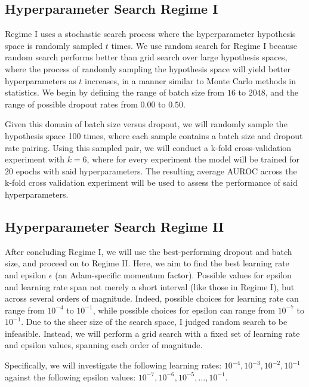 \subsection{Hyperparameter Search Regime I}\label{sec:regime-i}

Regime I uses a stochastic search process where the hyperparameter hypothesis space is randomly sampled \(t\) times. We use random search for Regime I because random search performs better than grid search over large hypothesis spaces, where the process of randomly sampling the hypothesis space will yield better hyperparameters as \(t\) increases, in a manner similar to Monte Carlo methods in statistics. \autocite{randomsearch} We begin by defining the range of batch size from \(16\) to \(2048\), and the range of possible dropout rates from \(0.00\) to \(0.50\).

Given this domain of batch size versus dropout, we will randomly sample the hypothesis space 100 times, where each sample contains a batch size and dropout rate pairing. Using this sampled pair, we will conduct a k-fold cross-validation experiment with \(k=6\), where for every experiment the model will be trained for \(20\) epochs with said hyperparameters. The resulting average AUROC across the k-fold cross validation experiment will be used to assess the performance of said hyperparameters.

\subsection{Hyperparameter Search Regime II}\label{sec:regime-ii}

After concluding Regime I, we will use the best-performing dropout and batch size, and proceed on to Regime II. Here, we aim to find the best learning rate and epsilon \(\epsilon\) (an Adam-specific momentum factor). Possible values for epsilon and learning rate span not merely a short interval (like those in Regime I), but across several orders of magnitude. Indeed, possible choices for learning rate can range from \(10^{-4}\) to \(10^{-1}\), while possible choices for epsilon can range from \(10^{-7}\) to \(10^{-1}\). Due to the sheer size of the search space, I judged random search to be infeasible. Instead, we will perform a grid search with a fixed set of learning rate and epsilon values, spanning each order of magnitude. 

Specifically, we will investigate the following learning rates: \(10^{-4}, 10^{-3}, 10^{-2}, 10^{-1}\) against the following epsilon values: \(10^{-7}, 10^{-6}, 10^{-5}, \ldots, 10^{-1}\).

